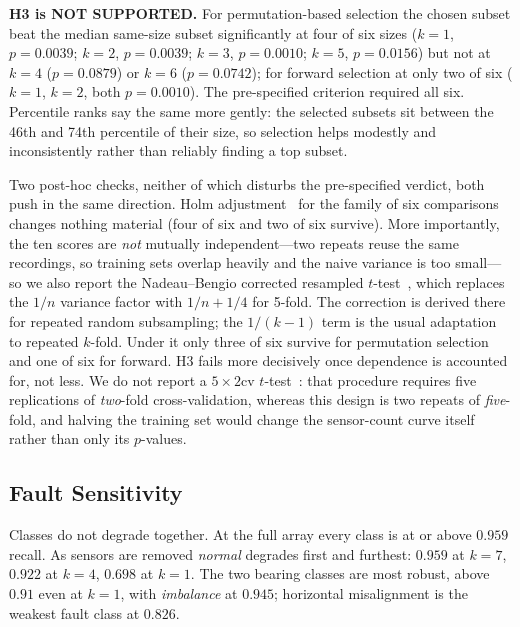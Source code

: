 \documentclass[conference]{IEEEtran}
\begin{document}
\textbf{H3 is NOT SUPPORTED.} For permutation-based selection the chosen subset
beat the median same-size subset significantly at four of six sizes ($k=1$,
$p=0.0039$; $k=2$, $p=0.0039$; $k=3$, $p=0.0010$; $k=5$, $p=0.0156$) but not at
$k=4$ ($p=0.0879$) or $k=6$ ($p=0.0742$); for forward selection at only two of
six ($k=1$, $k=2$, both $p=0.0010$). The pre-specified criterion required all
six. Percentile ranks say the same more gently: the selected subsets sit
between the 46th and 74th percentile of their size, so selection helps modestly
and inconsistently rather than reliably finding a top subset.

Two post-hoc checks, neither of which disturbs the pre-specified verdict,
both push in the same direction. Holm adjustment~\cite{holm1979} for the family of six comparisons changes
nothing material (four of six and two of six survive). More
importantly, the ten scores are \emph{not} mutually independent---two repeats
reuse the same recordings, so training sets overlap heavily and the naive
variance is too small---so we also report the Nadeau--Bengio corrected resampled
$t$-test~\cite{nadeau2003}, which replaces the $1/n$ variance factor with
$1/n+1/4$ for 5-fold. The correction is derived there for repeated random
subsampling; the $1/(k-1)$ term is the usual adaptation to repeated $k$-fold. Under it only three of six survive for permutation selection and one of
six for forward. H3 fails more decisively once dependence is accounted for, not
less. We do not report a $5\times2$cv $t$-test~\cite{dietterich1998}: that procedure
requires five
replications of \emph{two}-fold cross-validation, whereas this design is two
repeats of \emph{five}-fold, and halving the training set would change the
sensor-count curve itself rather than only its $p$-values.

\subsection{Fault Sensitivity}

Classes do not degrade together. At the full array every class is at or above
$0.959$ recall. As sensors are removed \emph{normal} degrades first and
furthest: $0.959$ at $k=7$, $0.922$ at $k=4$, $0.698$ at $k=1$. The two bearing
classes are most robust, above $0.91$ even at $k=1$, with \emph{imbalance} at
$0.945$; horizontal misalignment is the weakest fault class at $0.826$.
\end{document}
